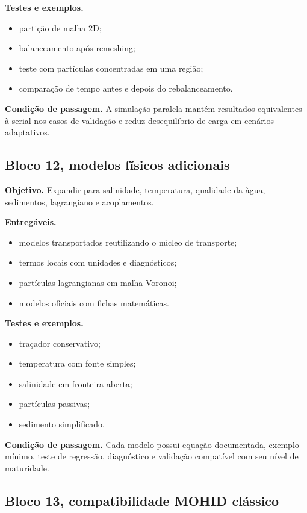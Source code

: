 \documentclass[11pt,a4paper]{article}
\begin{document}
\textbf{Testes e exemplos.}
\begin{itemize}
  \item parti\c{c}\~ao de malha 2D;
  \item balanceamento ap\'os remeshing;
  \item teste com part\'iculas concentradas em uma regi\~ao;
  \item compara\c{c}\~ao de tempo antes e depois do rebalanceamento.
\end{itemize}

\textbf{Condi\c{c}\~ao de passagem.} A simula\c{c}\~ao paralela mant\'em resultados equivalentes \`a serial nos casos de valida\c{c}\~ao e reduz desequil\'ibrio de carga em cen\'arios adaptativos.

\subsection*{Bloco 12, modelos f\'isicos adicionais}

\textbf{Objetivo.} Expandir para salinidade, temperatura, qualidade da \`agua, sedimentos, lagrangiano e acoplamentos.

\textbf{Entreg\'aveis.}
\begin{itemize}
  \item modelos transportados reutilizando o n\'ucleo de transporte;
  \item termos locais com unidades e diagn\'osticos;
  \item part\'iculas lagrangianas em malha Voronoi;
  \item modelos oficiais com fichas matem\'aticas.
\end{itemize}

\textbf{Testes e exemplos.}
\begin{itemize}
  \item tra\c{c}ador conservativo;
  \item temperatura com fonte simples;
  \item salinidade em fronteira aberta;
  \item part\'iculas passivas;
  \item sedimento simplificado.
\end{itemize}

\textbf{Condi\c{c}\~ao de passagem.} Cada modelo possui equa\c{c}\~ao documentada, exemplo m\'inimo, teste de regress\~ao, diagn\'ostico e valida\c{c}\~ao compat\'ivel com seu n\'ivel de maturidade.

\subsection*{Bloco 13, compatibilidade MOHID cl\'assico}
\end{document}
